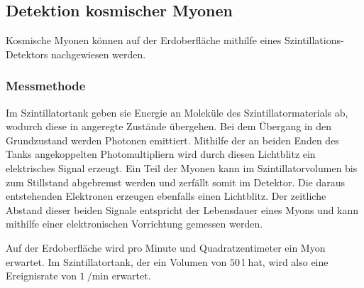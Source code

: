 \subsection{Detektion kosmischer Myonen}
Kosmische Myonen können auf der Erdoberfläche mithilfe eines Szintillations-Detektors nachgewiesen werden. 

\subsubsection{Messmethode}
Im Szintillatortank geben sie Energie an Moleküle des Szintillatormaterials ab, wodurch diese in angeregte Zustände übergehen. Bei dem Übergang in den Grundzustand werden Photonen emittiert. Mithilfe der an beiden Enden des Tanks angekoppelten Photomultipliern wird durch diesen Lichtblitz  ein elektrisches Signal erzeugt. Ein Teil der Myonen kann im Szintillatorvolumen bis zum Stillstand abgebremst werden und zerfällt somit im Detektor. Die daraus entstehenden Elektronen erzeugen ebenfalls einen Lichtblitz. Der zeitliche Abstand dieser beiden Signale entspricht der Lebensdauer eines Myons und kann mithilfe einer elektronischen Vorrichtung gemessen werden.

Auf der Erdoberfläche wird pro Minute und Quadratzentimeter ein Myon erwartet. Im Szintillatortank, der ein Volumen von $\SI{50}{\litre}$ hat, wird also eine Ereignisrate von $\SI{1}{\per\minute}$ erwartet. %


